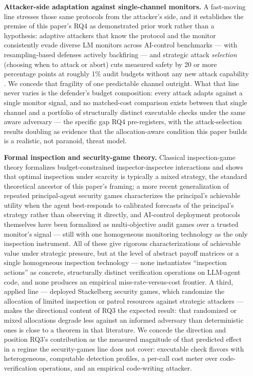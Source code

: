 \documentclass[11pt]{article}
\begin{document}
\textbf{Attacker-side adaptation against single-channel monitors.} A fast-moving line stresses those same protocols from the attacker's side, and it establishes the premise of this paper's RQ4 as demonstrated prior work rather than a hypothesis: adaptive attackers that know the protocol and the monitor consistently evade diverse LM monitors across AI-control benchmarks --- with resampling-based defenses actively backfiring \citep{AdaptiveAttacksMonitors2025} --- and strategic attack \emph{selection} (choosing when to attack or abort) cuts measured safety by 20 or more percentage points at roughly 1\% audit budgets without any new attack capability \citep{AttackSelectionConcentrated2026,AttackSelectionAgentic2026}. We concede that fragility of one predictable channel outright. What that line never varies is the defender's budget composition: every attack adapts against a single monitor signal, and no matched-cost comparison exists between that single channel and a portfolio of structurally distinct executable checks under the same aware adversary --- the specific gap RQ4 pre-registers, with the attack-selection results doubling as evidence that the allocation-aware condition this paper builds is a realistic, not paranoid, threat model.

\textbf{Formal inspection and security-game theory.} Classical inspection-game theory \citep{AvenhausInspectionGames2002} formalizes budget-constrained inspector-inspectee interactions and shows that optimal inspection under scarcity is typically a mixed strategy, the standard theoretical ancestor of this paper's framing; a more recent generalization of repeated principal-agent security games \citep{CalibratedStackelberg2024} characterizes the principal's achievable utility when the agent best-responds to calibrated forecasts of the principal's strategy rather than observing it directly, and AI-control deployment protocols themselves have been formalized as multi-objective audit games over a trusted monitor's signal \citep{GamesForAIControl2024} --- still with one homogeneous monitoring technology as the only inspection instrument. All of these give rigorous characterizations of achievable value under strategic pressure, but at the level of abstract payoff matrices or a single homogeneous inspection technology --- none instantiates ``inspection actions'' as concrete, structurally distinct verification operations on LLM-agent code, and none produces an empirical miss-rate-versus-cost frontier. A third, applied line --- deployed Stackelberg security games, which randomize the allocation of limited inspection or patrol resources against strategic attackers \citep{Tambe2011SecurityGameTheory,SinhaEtAl2018SSG} --- makes the directional content of RQ3 the expected result: that randomized or mixed allocations degrade less against an informed adversary than deterministic ones is close to a theorem in that literature. We concede the direction and position RQ3's contribution as the measured magnitude of that predicted effect in a regime the security-games line does not cover: executable check flavors with heterogeneous, computable detection profiles, a per-call cost meter over code-verification operations, and an empirical code-writing attacker.
\end{document}
